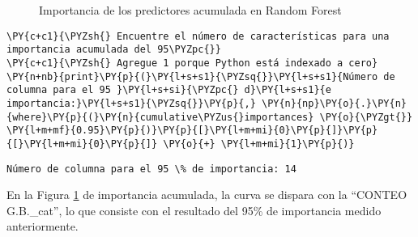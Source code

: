\begin{center}
    	\begin{figure}[H]
	\centering
	\caption{Importancia de los predictores acumulada en Random Forest}
	\label{fig:iparf}
	\end{figure}
\end{center}

    
    \begin{tcolorbox}[breakable, size=fbox, boxrule=1pt, pad at break*=1mm,colback=cellbackground, colframe=cellborder]
\begin{Verbatim}[commandchars=\\\{\}]
\PY{c+c1}{\PYZsh{} Encuentre el número de características para una importancia acumulada del 95\PYZpc{}}
\PY{c+c1}{\PYZsh{} Agregue 1 porque Python está indexado a cero}
\PY{n+nb}{print}\PY{p}{(}\PY{l+s+s1}{\PYZsq{}}\PY{l+s+s1}{Número de columna para el 95 }\PY{l+s+si}{\PYZpc{} d}\PY{l+s+s1}{e importancia:}\PY{l+s+s1}{\PYZsq{}}\PY{p}{,} \PY{n}{np}\PY{o}{.}\PY{n}{where}\PY{p}{(}\PY{n}{cumulative\PYZus{}importances} \PY{o}{\PYZgt{}} \PY{l+m+mf}{0.95}\PY{p}{)}\PY{p}{[}\PY{l+m+mi}{0}\PY{p}{]}\PY{p}{[}\PY{l+m+mi}{0}\PY{p}{]} \PY{o}{+} \PY{l+m+mi}{1}\PY{p}{)}
\end{Verbatim}
\end{tcolorbox}

    \begin{Verbatim}[commandchars=\\\{\}]
Número de columna para el 95 \% de importancia: 14
    \end{Verbatim}

    En la Figura \ref{fig:iparf} de importancia acumulada, la curva se dispara con la ``CONTEO G.B.\_cat'', lo que consiste con el resultado del 95\% de importancia medido anteriormente.\\

